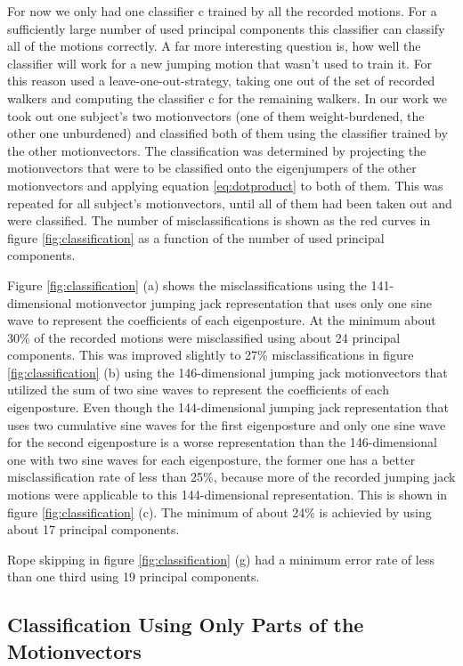 \documentclass[a4paper]{article}
\begin{document}
For now we only had one classifier c trained by all the recorded motions.
For a sufficiently large number of used principal components this classifier can classify all of the motions correctly.
A far more interesting question is, how well the classifier will work for a new jumping motion that wasn't used to train it.
For this reason \cite{origin} used a leave-one-out-strategy, taking one out of the set of recorded walkers and computing the classifier c for the remaining walkers.
In our work we took out one subject's two motionvectors (one of them weight-burdened, the other one unburdened) and classified both of them using the classifier trained by the other motionvectors.
The classification was determined by projecting the motionvectors that were to be classified onto the eigenjumpers of the other motionvectors and applying equation \ref{eq:dotproduct} to both of them.
This was repeated for all subject's motionvectors, until all of them had been taken out and were classified.
The number of misclassifications is shown as the red curves in figure \ref{fig:classification} as a function of the number of used principal components.

Figure \ref{fig:classification} (a) shows the misclassifications using the 141-dimensional motionvector jumping jack representation that uses only one sine wave to represent the coefficients of each eigenposture.
At the minimum about 30\% of the recorded motions were misclassified using about 24 principal components.
This was improved slightly to 27\% misclassifications in figure \ref{fig:classification} (b) using the 146-dimensional jumping jack motionvectors that utilized the sum of two sine waves to represent the coefficients of each eigenposture.
Even though the 144-dimensional jumping jack representation that uses two cumulative sine waves for the first eigenposture and only one sine wave for the second eigenposture is a worse representation than the 146-dimensional one with two sine waves for each eigenposture, the former one has a better misclassification rate of less than 25\%, because more of the recorded jumping jack motions were applicable to this 144-dimensional representation.
This is shown in figure \ref{fig:classification} (c).
The minimum of about 24\% is achievied by using about 17 principal components.

Rope skipping in figure \ref{fig:classification} (g) had a minimum error rate of less than one third using 19 principal components.

\subsection{Classification Using Only Parts of the Motionvectors}
\end{document}
